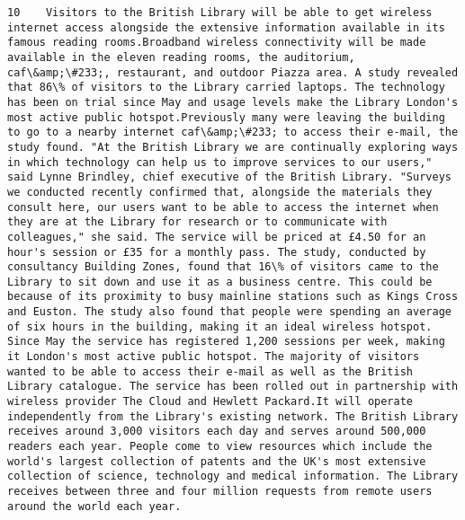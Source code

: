 \documentclass[11pt]{article}
\begin{document}
\begin{Verbatim}[commandchars=\\\{\}]
         10    Visitors to the British Library will be able to get wireless internet access alongside the extensive information available in its famous reading rooms.Broadband wireless connectivity will be made available in the eleven reading rooms, the auditorium, caf\&amp;\#233;, restaurant, and outdoor Piazza area. A study revealed that 86\% of visitors to the Library carried laptops. The technology has been on trial since May and usage levels make the Library London's most active public hotspot.Previously many were leaving the building to go to a nearby internet caf\&amp;\#233; to access their e-mail, the study found. "At the British Library we are continually exploring ways in which technology can help us to improve services to our users," said Lynne Brindley, chief executive of the British Library. "Surveys we conducted recently confirmed that, alongside the materials they consult here, our users want to be able to access the internet when they are at the Library for research or to communicate with colleagues," she said. The service will be priced at £4.50 for an hour's session or £35 for a monthly pass. The study, conducted by consultancy Building Zones, found that 16\% of visitors came to the Library to sit down and use it as a business centre. This could be because of its proximity to busy mainline stations such as Kings Cross and Euston. The study also found that people were spending an average of six hours in the building, making it an ideal wireless hotspot. Since May the service has registered 1,200 sessions per week, making it London's most active public hotspot. The majority of visitors wanted to be able to access their e-mail as well as the British Library catalogue. The service has been rolled out in partnership with wireless provider The Cloud and Hewlett Packard.It will operate independently from the Library's existing network. The British Library receives around 3,000 visitors each day and serves around 500,000 readers each year. People come to view resources which include the world's largest collection of patents and the UK's most extensive collection of science, technology and medical information. The Library receives between three and four million requests from remote users around the world each year.                                                                                                                                                                                                                                                                                                                                                                                                                                                                                                                                                                                                                                                                                                                                                                                                                                                                                                                                                                                                                                                                           
\end{Verbatim}
\end{document}
